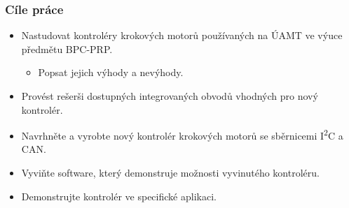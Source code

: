 \documentclass[%
  12pt,       				%
	t,                  %
	aspectratio=1610,   %
	unicode,						%
]{beamer}				    	%
\begin{document}
\disablenavigationsymbols

\maketitle

\begin{frame} 
	\frametitle{Cíle práce}
	\begin{itemize}
			\item Nastudovat kontroléry krokových motorů používaných na ÚAMT ve výuce předmětu BPC-PRP.
			\begin{itemize}
				\item Popsat jejich výhody a nevýhody.
			\end{itemize}
			\item Provést rešerši dostupných integrovaných obvodů vhodných pro nový kontrolér.
			\item Navrhněte a vyrobte nový kontrolér krokových motorů se sběrnicemi I\textsuperscript{2}C a CAN.
			\item Vyviňte software, který demonstruje možnosti vyvinutého kontroléru.
			\item Demonstrujte kontrolér ve specifické aplikaci.
	\end{itemize}
\end{frame}
\end{document}
